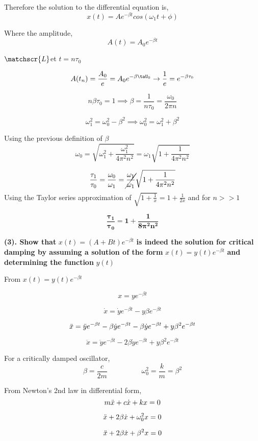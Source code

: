 \documentclass[12pt]{article}
\begin{document}
Therefore the solution to the differential equation is,
$$
x(t) = Ae^{-\beta t} cos(\omega_1 t + \phi)
$$

Where the amplitude,
$$
A(t) = A_0 e^{- \beta t}
$$

$\matchscr{L}$et $t = n\tau_0$

$$
A(t_n) = \frac{A_0}{e} = A_0 e^{- \beta \taU_0} \rightarrow \frac{1}{e} = e^{- \beta \tau_0}
$$

$$
n \beta \tau_0 = 1 \implies \beta = \frac{1}{n \tau_0} = \frac{\omega_0}{2 \pi n}
$$

$$
\omega^2_1 = \omega^2_0 - \beta^2 \implies \omega^2_0 = \omega^2_1 + \beta^2
$$

Using the previous definition of $\beta$
$$
\omega_0 = \sqrt{\omega_1^2 + \frac{\omega_1^2}{4 \pi^2 n^2}} = \omega_1 \sqrt{1 + \frac{1}{4 \pi^2 n^2}}
$$

$$
\frac{\tau_1}{\tau_0} = \frac{\omega_0}{\omega_1} = \cancel{\frac{\omega_1}{\omega_1}} \sqrt{1 + \frac{1}{4 \pi^2 n^2}}
$$
Using the Taylor series approximation of $\sqrt{1+\frac{1}{x}} = 1 + \frac{1}{2x}$ and for $n >> 1$

$$
\boldsymbol{
\frac{\tau_1}{\tau_0} = 1 + \frac{1}{8 \pi^2 n^2}
}
$$

\newpage
\textbf{
(3). Show that} $x(t) = (A + Bt)e^{-\beta t}$ \textbf{ is indeed the solution for critical damping by assuming a solution of the form} $x(t) = y(t) e^{-\beta t}$ \textbf{ and determining the function} $y(t)$

\hspace{0.5cm}

From $x(t) = y(t) e^{- \beta t}$

$$
x = y e^{-\beta t}
$$

$$
\dot{x} = \dot{y} e^{- \beta t} - y \beta e^{- \beta t}
$$

$$
\Ddot{x} = \ddot{y} e^{- \beta t} - \beta \dot{y} e^{- \beta t} - \beta \dot{y} e^{- \beta t} + y \beta^2 e^{- \beta t}
$$

$$
\ddot{x} = \ddot{y} e^{- \beta t} - 2 \beta \dot{y} e^{- \beta t} + y \beta^2 e^{- \beta t}
$$

For a critically damped oscillator,
$$
\beta = \frac{c}{2m} \hspace{2cm} \omega_0^2 = \frac{k}{m} = \beta^2
$$

From Newton's 2nd law in differential form,
$$
m \Ddot{x} + c \dot{x} + kx = 0
$$

$$
\Ddot{x} + 2 \beta \dot{x} + \omega_0^2 x = 0
$$

$$
\Ddot{x} + 2 \beta \dot{x} + \beta^2 x = 0
$$
\end{document}
